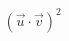 \documentclass[preview]{standalone}
\begin{document}
\begin{align*}
&{\left(\vec{u} \cdot \vec{v} \right)}^2 \\
\end{align*}
\end{document}
